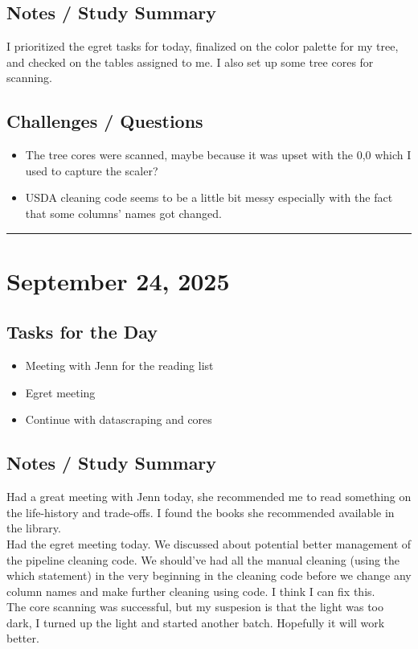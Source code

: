 \documentclass[12pt]{article}
\begin{document}
\subsection*{Notes / Study Summary}
I prioritized the egret tasks for today, finalized on the color palette for my tree, and checked on the tables assigned to me. I also set up some tree cores for scanning.
\subsection*{Challenges / Questions}
\begin{itemize}
    \item The tree cores were scanned, maybe because it was upset with the 0,0 which I used to capture the scaler?
    \item USDA cleaning code seems to be a little bit messy especially with the fact that some columns' names got changed.
\end{itemize}

\vspace{1em}
\hrule
\vspace{1em}
\section*{September 24, 2025}

\subsection*{Tasks for the Day}
\begin{itemize}
    \item Meeting with Jenn for the reading list
    \item Egret meeting
    \item Continue with datascraping and cores
\end{itemize}
\subsection*{Notes / Study Summary}
Had a great meeting with Jenn today, she recommended me to read something on the life-history and trade-offs. I found the books she recommended available in the library.\\
Had the egret meeting today. We discussed about potential better management of the pipeline cleaning code. We should've had all the manual cleaning (using the which statement) in the very beginning in the cleaning code before we change any column names and make further cleaning using code. I think I can fix this.\\
The core scanning was successful, but my suspesion is that the light was too dark, I turned up the light and started another batch. Hopefully it will work better.
\end{document}
